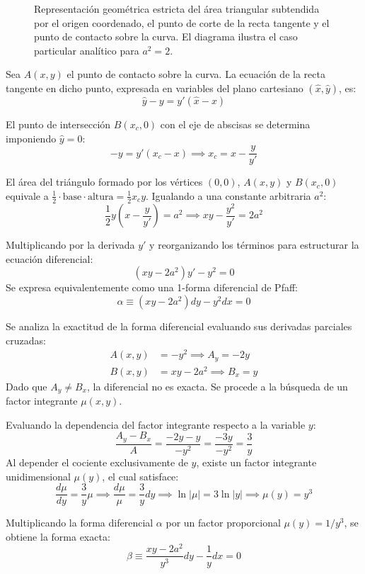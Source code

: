 \begin{tcolorbox}
\begin{figure}[H]
    \centering
    
    \caption{Representación geométrica estricta del área triangular subtendida por el origen coordenado, el punto de corte de la recta tangente y el punto de contacto sobre la curva. El diagrama ilustra el caso particular analítico para $a^2=2$.}
\end{figure}

Sea $A(x,y)$ el punto de contacto sobre la curva. La ecuación de la recta tangente en dicho punto, expresada en variables del plano cartesiano $(\hat{x}, \hat{y})$, es:
$$ \hat{y} - y = y'(\hat{x} - x) $$

El punto de intersección $B(x_c, 0)$ con el eje de abscisas se determina imponiendo $\hat{y} = 0$:
$$ -y = y'(x_c - x) \implies x_c = x - \frac{y}{y'} $$

El área del triángulo formado por los vértices $(0,0)$, $A(x,y)$ y $B(x_c, 0)$ equivale a $\frac{1}{2} \cdot \text{base} \cdot \text{altura} = \frac{1}{2} x_c y$. Igualando a una constante arbitraria $a^2$:
$$ \frac{1}{2}y \left( x - \frac{y}{y'} \right) = a^2 \implies xy - \frac{y^2}{y'} = 2a^2 $$

Multiplicando por la derivada $y'$ y reorganizando los términos para estructurar la ecuación diferencial:
$$ (xy - 2a^2)y' - y^2 = 0 $$
Se expresa equivalentemente como una 1-forma diferencial de Pfaff:
$$ \alpha \equiv (xy - 2a^2)dy - y^2 dx = 0 $$

Se analiza la exactitud de la forma diferencial evaluando sus derivadas parciales cruzadas:
\begin{align*}
    A(x,y) &= -y^2 \implies A_y = -2y \\
    B(x,y) &= xy - 2a^2 \implies B_x = y
\end{align*}
Dado que $A_y \neq B_x$, la diferencial no es exacta. Se procede a la búsqueda de un factor integrante $\mu(x,y)$.

Evaluando la dependencia del factor integrante respecto a la variable $y$:
$$ \frac{A_y - B_x}{A} = \frac{-2y - y}{-y^2} = \frac{-3y}{-y^2} = \frac{3}{y} $$
Al depender el cociente exclusivamente de $y$, existe un factor integrante unidimensional $\mu(y)$, el cual satisface:
$$ \frac{d\mu}{dy} = \frac{3}{y}\mu \implies \frac{d\mu}{\mu} = \frac{3}{y}dy \implies \ln|\mu| = 3\ln|y| \implies \mu(y) = y^3 $$

Multiplicando la forma diferencial $\alpha$ por un factor proporcional $\mu(y) = 1/y^3$, se obtiene la forma exacta:
$$ \beta \equiv \frac{xy - 2a^2}{y^3}dy - \frac{1}{y}dx = 0 $$


\end{tcolorbox}
